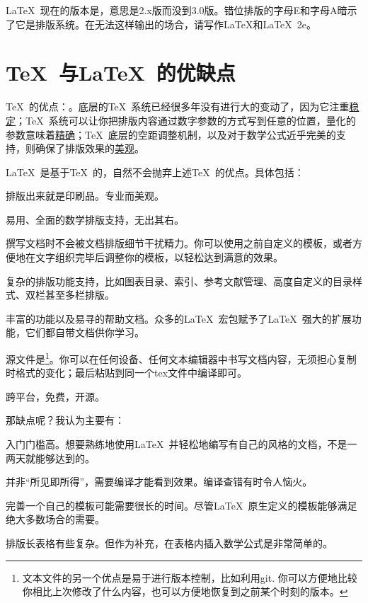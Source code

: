 \LaTeX\ 现在的版本是\LaTeXe ，意思是2.x版而没到3.0版。错位排版的字母E和字母A暗示了它是排版系统。在无法这样输出的场合，请写作LaTeX和LaTeX~2e。

\section{\TeX\ 与\LaTeX\ 的优缺点}
\TeX\ 的优点：。底层的\TeX\ 系统已经很多年没有进行大的变动了，因为它注重\uline{稳定}；\TeX\ 系统可以让你把排版内容通过数字参数的方式写到任意的位置，量化的参数意味着\uline{精确}；\TeX\ 底层的空距调整机制，以及对于数学公式近乎完美的支持，则确保了排版效果的\uline{美观}。

\LaTeX\ 是基于\TeX\ 的，自然不会抛弃上述\TeX\ 的优点。具体包括：
\begin{feai}
\item 排版出来就是印刷品。专业而美观。
\item 易用、全面的数学排版支持，无出其右。
\item 撰写文档时不会被文档排版细节干扰精力。你可以使用之前自定义的模板，或者方便地在文字组织完毕后调整你的模板，以轻松达到满意的效果。
\item 复杂的排版功能支持，比如图表目录、索引、参考文献管理、高度自定义的目录样式、双栏甚至多栏排版。
\item 丰富的功能以及易寻的帮助文档。众多的\LaTeX\ 宏包赋予了\LaTeX\ 强大的扩展功能，它们都自带文档供你学习。
\item 源文件是\footnote{文本文件的另一个优点是易于进行版本控制，比如利用git. 你可以方便地比较你相比上次修改了什么内容，也可以方便地恢复到之前某个时刻的版本。}。你可以在任何设备、任何文本编辑器中书写文档内容，无须担心复制时格式的变化；最后粘贴到同一个tex文件中编译即可。
\item 跨平台，免费，开源。
\end{feai}

那缺点呢？我认为主要有：
\begin{feai}
\item 入门门槛高。想要熟练地使用\LaTeX\ 并轻松地编写有自己的风格的文档，不是一两天就能够达到的。
\item 并非“所见即所得”，需要编译才能看到效果。编译查错有时令人恼火。
\item 完善一个自己的模板可能需要很长的时间。尽管\LaTeX\ 原生定义的模板能够满足绝大多数场合的需要。
\item 排版长表格有些复杂。但作为补充，在表格内插入数学公式是非常简单的。
\end{feai}

